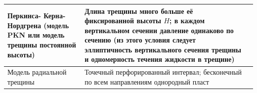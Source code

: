 \begin{longtable}[l]{|L{2.2cm}|m{7.3cm}|L{6.2cm}|}
	Перкинса- Керна- Нордгрена (модель PKN или модель трещины постоянной высоты)&Длина трещины много больше её фиксированной высоты $H$; в каждом вертикальном сечении давление одинаково по сечению (из этого условия следует эллиптичность вертикального сечения трещины и одномерность течения жидкости в трещине)&\hfill\break{}\hfill\break\\ \hline
	Модель радиальной трещины&Точечный перфорированный интервал; бесконечный по всем направлениям однородный пласт&\hfill\break{}\hfill\break\\ \hline

\end{longtable}
